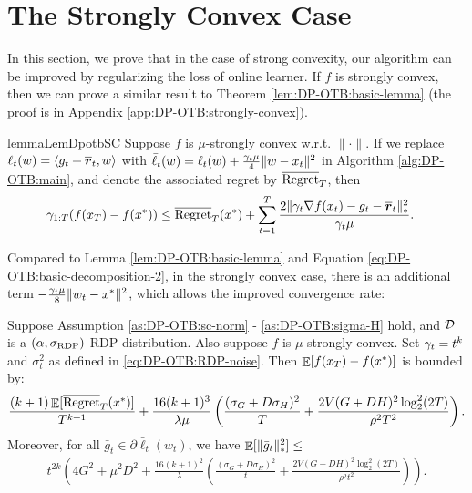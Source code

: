 \section{The Strongly Convex Case}
\label{sec:DP-OTB_strongly-convex}

In this section, we prove that in the case of strong convexity, our algorithm can be improved by regularizing the loss of online learner.
If $ f$ is strongly convex, then we can prove a similar result to Theorem \ref{lem:DP-OTB:basic-lemma} (the proof is in Appendix \ref{app:DP-OTB:strongly-convex}).

\begin{restatable}{lemma}{LemDpotbSC}
\label{lem:DP-OTB:strongly-convex-regularized-loss}
Suppose $f$ is $\mu$-strongly convex w.r.t. $\|\cdot\|$. If we replace $\ell_t(w)=\langle g_t+\overline{{\boldsymbol{r}}}_t,w\rangle$ with $\bar \ell_t(w)=\ell_t(w)+\frac{\gamma_t\mu}{4}\|w-x_t\|^2$ in Algorithm \ref{alg:DP-OTB:main}, and denote the associated regret by $\overline {\mathrm{Regret}}_T$, then
\begin{align*}
    \gamma_{1:T} ( f(x_T) -  f(x^*))
    &\leq \overline{\mathrm{Regret}}_T(x^*) + \sum_{t=1}^T \frac{2\|\gamma_t\nabla f(x_t)-g_t-\overline{{\boldsymbol{r}}}_t\|_*^2}{\gamma_t \mu}.
\end{align*}
\end{restatable}

Compared to Lemma \ref{lem:DP-OTB:basic-lemma} and Equation \ref{eq:DP-OTB:basic-decomposition-2}, in the strongly convex case, there is an additional term $-\frac{\gamma_t\mu}{8}\|w_t-x^*\|^2$, which allows the improved convergence rate:

\begin{theorem}
\label{thm:DP-OTB:strongly-convex}
Suppose Assumption \ref{as:DP-OTB:sc-norm} - \ref{as:DP-OTB:sigma-H} hold, and ${\cal D}$ is a $(\alpha,\sigma_{\mathrm{RDP}})$-RDP distribution. Also suppose $ f$ is $\mu$-strongly convex. Set $\gamma_t=t^k$ and $\sigma_t^2$ as defined in \eqref{eq:DP-OTB:RDP-noise}. Then $\mathop{\mathbb{E}}[ f(x_T) -  f(x^*)]$ is bounded by:
\begin{align*}
    \frac{(k+1)\mathop{\mathbb{E}}[\overline{\mathrm{Regret}}_T(x^*)]}{T^{k+1}} 
    + \frac{16(k+1)^3}{\lambda \mu} \left( \frac{(\sigma_G+D\sigma_H)^2}{T} + \frac{2V(G+DH)^2\log_2^2(2T)}{\rho^2T^2} \right).
\end{align*}
Moreover, for all $\bar g_t\in \partial \bar \ell_t(w_t)$, we have $\mathop{\mathbb{E}}[\|\bar g_t\|_*^2] \leq$
\begin{align*}
    t^{2k}\left( 4G^2 + \mu^2D^2 + \frac{16(k+1)^2}{\lambda}\left(\frac{(\sigma_G+D\sigma_H)^2}{t} + \frac{2V(G+DH)^2\log_2^2(2T)}{\rho^2t^2}\right) \right).
\end{align*}
\end{theorem}

